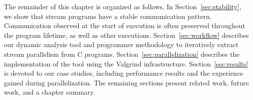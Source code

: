 The remainder of this chapter is organized as follows.  In
Section~\ref{sec:stability}, we show that stream programs have a
stable communication pattern.  Communication observed at the start of
execution is often preserved throughout the program lifetime, as well
as other executions.  Section~\ref{sec:workflow} describes our dynamic
analysis tool and programmer methodology to iteratively extract stream
parallelism from C programs.  Section~\ref{sec:parallelization}
describes the implementation of the tool using the Valgrind
infrastructure.  Section~\ref{sec:results} is devoted to our case
studies, including performance results and the experience gained
during parallelization.  The remaining sections present related work,
future work, and a chapter summary.



